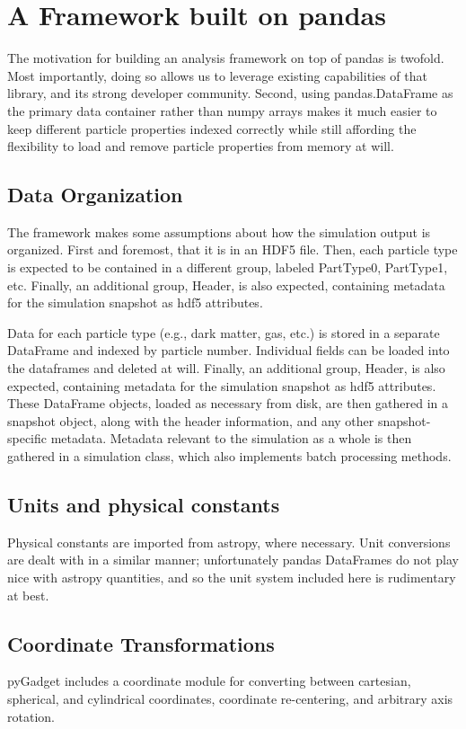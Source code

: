 \section{A Framework built on pandas}
\label{framework}

The motivation for building an analysis framework on top of pandas is twofold.  Most importantly, doing so allows us to leverage existing capabilities of that library, and its strong developer community.  Second, using pandas.DataFrame as the primary data container rather than numpy arrays makes it much easier to keep different particle properties indexed correctly while still affording the flexibility to load and remove particle properties from memory at will.

\subsection{Data Organization}
\label{hierarchy}
The framework makes some assumptions about how the simulation output is organized.  First and foremost, that it is in an HDF5 file.  Then, each particle type is expected to be contained in a different group, labeled PartType0, PartType1, etc. Finally, an additional group, Header, is also expected, containing metadata for the simulation snapshot as hdf5 attributes.  

Data for each particle type (e.g., dark matter, gas, etc.) is stored in a separate DataFrame and indexed by particle number.  Individual fields can be loaded into the dataframes and deleted at will.  Finally, an additional group, Header, is also expected, containing metadata for the simulation snapshot as hdf5 attributes.  These DataFrame objects, loaded as necessary from disk, are then gathered in a snapshot object, along with the header information, and any other snapshot-specific metadata.  Metadata relevant to the simulation as a whole is then gathered in a simulation class, which also implements batch processing methods.

\subsection{Units and physical constants}
\label{units}
Physical constants are imported from astropy, where necessary.  Unit conversions are dealt with in a similar manner; unfortunately pandas DataFrames do not play nice with astropy quantities, and so the unit system included here is rudimentary at best.

\subsection{Coordinate Transformations}
\label{coordinates}
pyGadget includes a coordinate module for converting between cartesian, spherical, and cylindrical coordinates, coordinate re-centering, and arbitrary axis rotation.